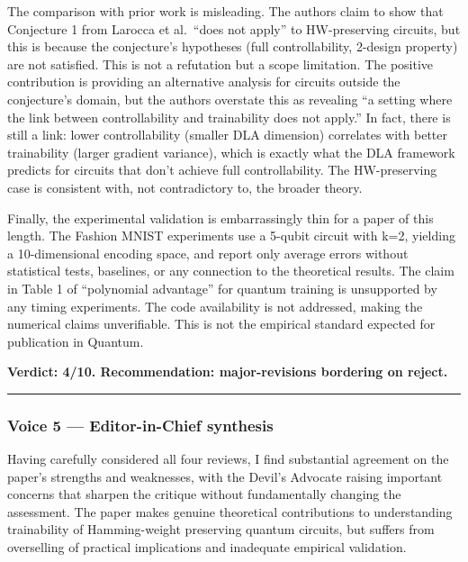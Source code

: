 \documentclass[10pt,letterpaper]{article}
\begin{document}
The comparison with prior work is misleading. The authors claim to show that Conjecture 1 from Larocca et al.~``does not apply'' to HW-preserving circuits, but this is because the conjecture's hypotheses (full controllability, 2-design property) are not satisfied. This is not a refutation but a scope limitation. The positive contribution is providing an alternative analysis for circuits outside the conjecture's domain, but the authors overstate this as revealing ``a setting where the link between controllability and trainability does not apply.'' In fact, there is still a link: lower controllability (smaller DLA dimension) correlates with better trainability (larger gradient variance), which is exactly what the DLA framework predicts for circuits that don't achieve full controllability. The HW-preserving case is consistent with, not contradictory to, the broader theory.

Finally, the experimental validation is embarrassingly thin for a paper of this length. The Fashion MNIST experiments use a 5-qubit circuit with k=2, yielding a 10-dimensional encoding space, and report only average errors without statistical tests, baselines, or any connection to the theoretical results. The claim in Table 1 of ``polynomial advantage'' for quantum training is unsupported by any timing experiments. The code availability is not addressed, making the numerical claims unverifiable. This is not the empirical standard expected for publication in Quantum.

\textbf{Verdict: 4/10. Recommendation: major-revisions bordering on reject.}

\begin{center}\rule{0.5\linewidth}{0.5pt}\end{center}

\hypertarget{voice-5-editor-in-chief-synthesis}{%
\subsubsection{Voice 5 --- Editor-in-Chief synthesis}\label{voice-5-editor-in-chief-synthesis}}

Having carefully considered all four reviews, I find substantial agreement on the paper's strengths and weaknesses, with the Devil's Advocate raising important concerns that sharpen the critique without fundamentally changing the assessment. The paper makes genuine theoretical contributions to understanding trainability of Hamming-weight preserving quantum circuits, but suffers from overselling of practical implications and inadequate empirical validation.
\end{document}
